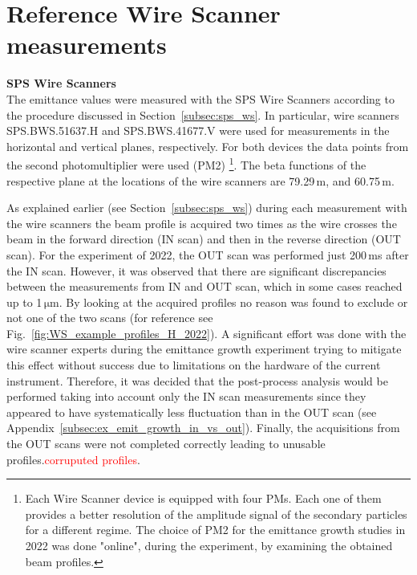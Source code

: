 \section{Reference Wire Scanner measurements}\label{sec:sps_transverse_beam_profiles}


\textbf{SPS Wire Scanners}\\
The emittance values were measured with the SPS Wire Scanners according to the procedure discussed in Section~\ref{subsec:sps_ws}. In particular, wire scanners SPS.BWS.51637.H and SPS.BWS.41677.V were used for measurements in the horizontal and vertical planes, respectively. For both devices the data points from the second photomultiplier were used (PM2) \footnote{Each Wire Scanner device is equipped with four PMs. Each one of them provides a better resolution of the amplitude signal of the secondary particles for a different regime. The choice of PM2 for the emittance growth studies in 2022 was done "online", during the experiment, by examining the obtained beam profiles.}. The beta functions of the respective plane at the locations of the wire scanners are 79.29\,m, and  60.75\,m. 

As explained earlier (see Section~\ref{subsec:sps_ws}) during each measurement with the wire scanners the beam profile is acquired two times as the wire crosses the beam in the forward direction (IN scan) and then in the reverse direction (OUT scan). For the experiment of 2022, the OUT scan was performed just 200\,ms after the IN scan. However, it was observed that there are significant discrepancies between the measurements from IN and OUT scan, which in some cases reached up to 1\,$\mathrm{\mu m}$. By looking at the acquired profiles no reason was found to exclude or not one of the two scans (for reference see Fig.~\ref{fig:WS_example_profiles_H_2022}). A significant effort was done with the wire scanner experts during the emittance growth experiment trying to mitigate this effect without success due to limitations on the hardware of the current instrument. Therefore, it was decided that the post-process analysis would be performed taking into account only the IN scan measurements since they appeared to have systematically less fluctuation than in the OUT scan (see Appendix~\ref{subsec:ex_emit_growth_in_vs_out}). Finally, the acquisitions from the OUT scans were not completed correctly leading to unusable profiles.\textcolor{red}{corruputed profiles}. 

